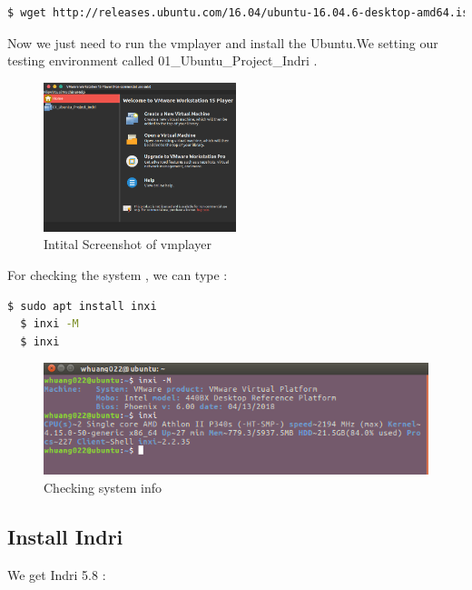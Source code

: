 \documentclass{article}
\begin{document}
\begin{lstlisting}[language=bash,caption={Get the iso file of Ubuntu 16.04}]
  $ wget http://releases.ubuntu.com/16.04/ubuntu-16.04.6-desktop-amd64.iso
\end{lstlisting}

Now we just need to run the vmplayer and install the Ubuntu.We setting our testing environment called  01\_Ubuntu\_Project\_Indri .
\begin{figure}[H]
  \begin{center}
  \includegraphics[width=0.5\textwidth]{image/vmplayer_start.png}
  \caption{Intital Screenshot of vmplayer }
  \label{fig:env_02}
  \end{center}
\end{figure}

For checking the system , we can type :

\begin{lstlisting}[language=bash,caption={Get system info}]
  $ sudo apt install inxi 
  $ inxi -M
  $ inxi 
\end{lstlisting}

\begin{figure}[H]
  \begin{center}
  \includegraphics[width=1.0\textwidth]{image/vmplayer_status.png}
  \caption{Checking system info}
  \label{fig:env_03}
  \end{center}
\end{figure}

\subsection{Install Indri}
We get Indri 5.8 :
\end{document}
